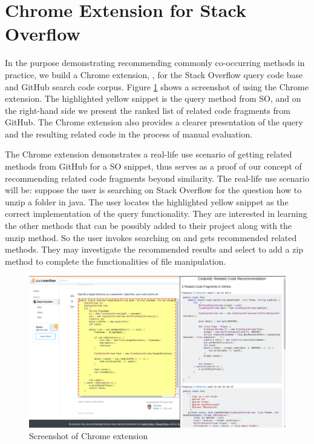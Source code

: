 \section{Chrome Extension for Stack Overflow}
\label{sec:chrome}

In the purpose demonstrating recommending commonly co-occurring methods in practice, we build a Chrome extension, {\tool}, for the Stack Overflow query code base and GitHub search code corpus. Figure \ref{fig:chrome} shows a screenshot of using the Chrome extension. The highlighted yellow snippet is the query method from SO, and on the right-hand side we present the ranked list of related code fragments from GitHub. The Chrome extension also provides a clearer presentation of the query and the resulting related code in the process of manual evaluation.

The Chrome extension demonstrates a real-life use scenario of getting related methods from GitHub for a SO snippet, thus serves as a proof of our concept of recommending related code fragments beyond similarity.
The real-life use scenario will be: suppose the user is searching on Stack Overflow for the question {\ttt how to unzip a folder in java}. The user locates the highlighted yellow snippet as the correct implementation of the query functionality. They are interested in learning the other methods that can be possibly added to their project along with the {\ttt unzip} method. So the user invokes searching on {\tool} and gets recommended related methods. They may investigate the recommended results and select to add a {\ttt zip} method to complete the functionalities of file manipulation. 

\begin{figure}[!h]
	\includegraphics[width=\linewidth]{figures/ui.png}
	\caption{Screenshot of Chrome extension}
	\label{fig:chrome}
\end{figure}